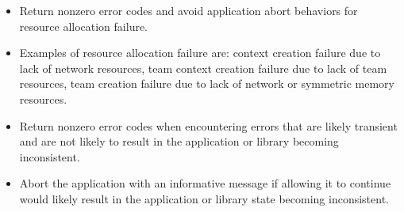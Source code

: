 \begin{itemize}
\item Return nonzero error codes and avoid application abort behaviors for resource allocation failure.
\item[] Examples of resource allocation failure are: context creation failure due to lack of network resources, team context creation failure due to lack of team resources, team creation failure due to lack of network or symmetric memory resources.
\item Return nonzero error codes when encountering errors that are likely transient and are not likely to result in the application or library becoming inconsistent.
\item Abort the application with an informative message if allowing it to continue would likely result in the application or library state becoming inconsistent.
\end{itemize}



